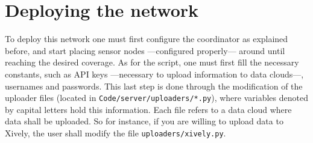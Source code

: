 \section{Deploying the network}

To deploy this network one must first configure the coordinator as explained before, and start placing sensor nodes ---configured properly--- around until reaching the desired coverage. As for the script, one must first fill the necessary constants, such as API keys ---necessary to upload information to data clouds---, usernames and passwords. This last step is done through the modification of the uploader files (located in \texttt{Code/server/uploaders/*.py}), where variables denoted by capital letters hold this information. Each file refers to a data cloud where data shall be uploaded. So for instance, if you are willing to upload data to Xively, the user shall modify the file \texttt{uploaders/xively.py}.
